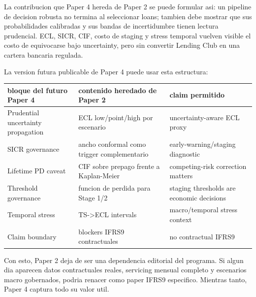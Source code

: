 \documentclass[
  spanish,
  11pt,
  letterpaper,
]{scrbook}
\newcounter{none} %
\theoremstyle{plain}
\theoremstyle{remark}
\begin{document}
La contribucion que Paper 4 hereda de Paper 2 se puede formular asi: un
pipeline de decision robusta no termina al seleccionar loans; tambien
debe mostrar que sus probabilidades calibradas y sus bandas de
incertidumbre tienen lectura prudencial. ECL, SICR, CIF, costo de
staging y stress temporal vuelven visible el costo de equivocarse bajo
uncertainty, pero sin convertir Lending Club en una cartera bancaria
regulada.

La version futura publicable de Paper 4 puede usar esta estructura:

{\def\LTcaptype{none} %
\begin{longtable}[]{@{}
  >{\raggedright\arraybackslash}p{}
  >{\raggedright\arraybackslash}p{}
  >{\raggedright\arraybackslash}p{}@{}}
\toprule\noalign{}
\begin{minipage}[b]{\linewidth}\raggedright
bloque del futuro Paper 4
\end{minipage} & \begin{minipage}[b]{\linewidth}\raggedright
contenido heredado de Paper 2
\end{minipage} & \begin{minipage}[b]{\linewidth}\raggedright
claim permitido
\end{minipage} \\
\midrule\noalign{}
\endhead
\bottomrule\noalign{}
\endlastfoot
Prudential uncertainty propagation & ECL low/point/high por escenario &
uncertainty-aware ECL proxy \\
SICR governance & ancho conformal como trigger complementario &
early-warning/staging diagnostic \\
Lifetime PD caveat & CIF sobre prepago frente a Kaplan-Meier &
competing-risk correction matters \\
Threshold governance & funcion de perdida para Stage 1/2 & staging
thresholds are economic decisions \\
Temporal stress & TS-\textgreater ECL intervals & macro/temporal stress
context \\
Claim boundary & blockers IFRS9 contractuales & no contractual IFRS9 \\
\end{longtable}
}

Con esto, Paper 2 deja de ser una dependencia editorial del programa. Si
algun dia aparecen datos contractuales reales, servicing mensual
completo y escenarios macro gobernados, podria renacer como paper IFRS9
especifico. Mientras tanto, Paper 4 captura todo su valor util.
\end{document}
